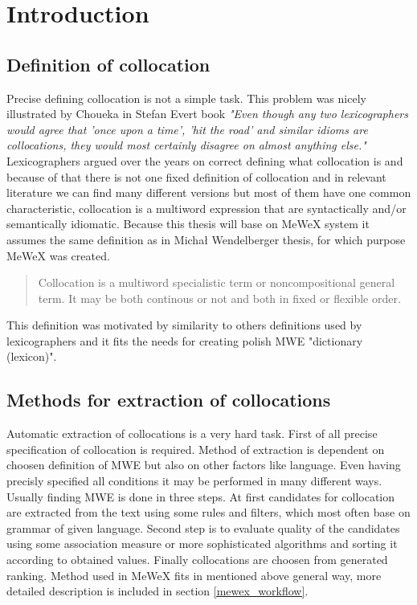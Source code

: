 
\chapter{Introduction}

\section{Definition of collocation}


Precise defining collocation is not a simple task. This problem was nicely illustrated by Choueka in Stefan Evert book 
\textit{"Even though any two lexicographers would agree that ’once upon a time’, ’hit the road’ and similar idioms are collocations,
they would most certainly disagree on almost anything else."}
Lexicographers argued over the years on correct defining what collocation is and because of that there is not one fixed definition of collocation  
and in relevant literature we can find many different versions but most of them have one common characteristic, 
collocation is a multiword expression that are syntactically and/or semantically idiomatic. Because this thesis will base on MeWeX system 
it assumes the same definition as in Michał Wendelberger thesis, for which purpose MeWeX was created.
\begin{quote}
    Collocation is a multiword specialistic term or noncompositional general term. 
    It may be both continous or not and both in fixed or flexible order.
    \cite{mgr}
\end{quote}
This definition was motivated by similarity to others definitions used by lexicographers and it fits the needs for creating polish MWE "dictionary (lexicon)". 

\section{Methods for extraction of collocations} \label{extraction_method}
Automatic extraction of collocations is a very hard task. First of all precise specification of collocation is required.
Method of extraction is dependent on choosen definition of MWE but also on other factors like language. 
Even having precisly specified all conditions it may be performed in many different ways. 
Usually finding MWE is done in three steps. At first candidates for collocation are extracted from the text using some rules and filters, 
which most often base on grammar of given language. Second step is to evaluate quality of the candidates 
using some association measure or more sophisticated algorithms and sorting it according to obtained values. 
Finally collocations are choosen from generated ranking. Method used in MeWeX fits in mentioned above general way, 
more detailed description is included in section \ref{mewex_workflow}.

